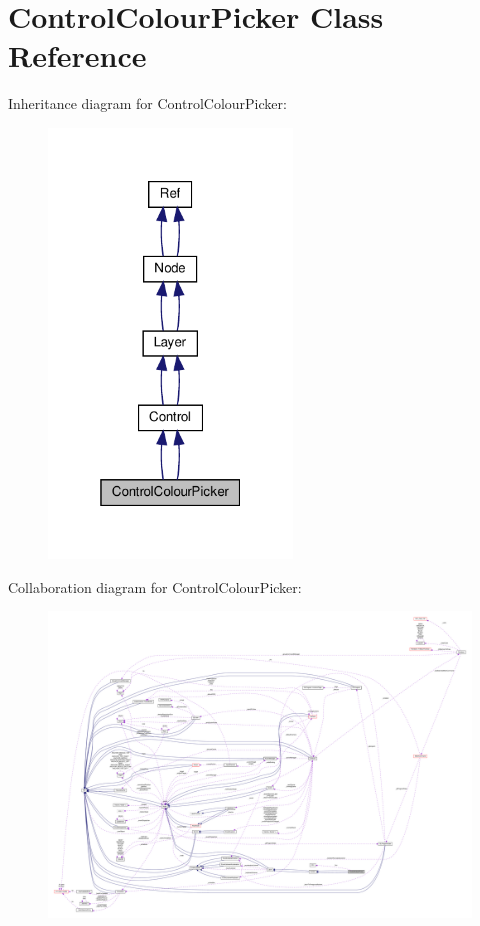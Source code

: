 \hypertarget{classControlColourPicker}{}\section{Control\+Colour\+Picker Class Reference}
\label{classControlColourPicker}


Inheritance diagram for Control\+Colour\+Picker\+:
\nopagebreak
\begin{figure}[H]
\begin{center}
\leavevmode
\includegraphics[width=184pt]{classControlColourPicker__inherit__graph}
\end{center}
\end{figure}


Collaboration diagram for Control\+Colour\+Picker\+:
\nopagebreak
\begin{figure}[H]
\begin{center}
\leavevmode
\includegraphics[width=350pt]{classControlColourPicker__coll__graph}
\end{center}
\end{figure}
